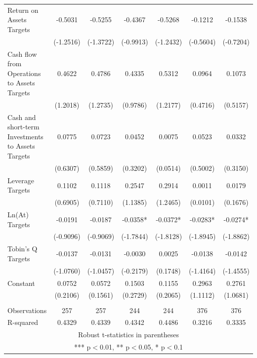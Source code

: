 \documentclass[12pt]{article}
\begin{document}
\begin{table}[ht]
\begin{adjustbox}{max width=\textwidth}
\begin{tabular}{lcccccc}
			Return on Assets Targets & -0.5031 & -0.5255 & -0.4367 & -0.5268 & -0.1212 & -0.1538 \\
			& (-1.2516) & (-1.3722) & (-0.9913) & (-1.2432) & (-0.5604) & (-0.7204) \\
			Cash flow from Operations to Assets Targets & 0.4622 & 0.4786 & 0.4335 & 0.5312 & 0.0964 & 0.1073 \\
			& (1.2018) & (1.2735) & (0.9786) & (1.2177) & (0.4716) & (0.5157) \\
			Cash and short-term Investments to Assets Targets & 0.0775 & 0.0723 & 0.0452 & 0.0075 & 0.0523 & 0.0332 \\
			& (0.6307) & (0.5859) & (0.3202) & (0.0514) & (0.5002) & (0.3150) \\
			Leverage Targets & 0.1102 & 0.1118 & 0.2547 & 0.2914 & 0.0011 & 0.0179 \\
			& (0.6905) & (0.7110) & (1.1385) & (1.2465) & (0.0101) & (0.1676) \\
			Ln(At) Targets & -0.0191 & -0.0187 & -0.0358* & -0.0372* & -0.0283* & -0.0274* \\
			& (-0.9096) & (-0.9069) & (-1.7844) & (-1.8128) & (-1.8945) & (-1.8862) \\
			Tobin's Q Targets & -0.0137 & -0.0131 & -0.0030 & 0.0025 & -0.0138 & -0.0142 \\
			& (-1.0760) & (-1.0457) & (-0.2179) & (0.1748) & (-1.4164) & (-1.4555) \\
			Constant & 0.0752 & 0.0572 & 0.1503 & 0.1155 & 0.2963 & 0.2761 \\
			& (0.2106) & (0.1561) & (0.2729) & (0.2065) & (1.1112) & (1.0681) \\
			&  &  &  &  &  &  \\
			Observations & 257 & 257 & 244 & 244 & 376 & 376 \\
			R-squared & 0.4329 & 0.4339 & 0.4342 & 0.4486 & 0.3216 & 0.3335 \\ \hline
			\multicolumn{7}{c}{ Robust t-statistics in parentheses} \\
			\multicolumn{7}{c}{ *** p$<$0.01, ** p$<$0.05, * p$<$0.1} \\
		\end{tabular}
	\end{adjustbox}
\end{table}
\end{document}
